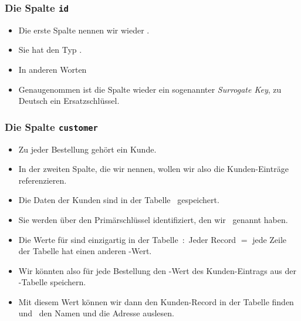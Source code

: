 \documentclass[aspectratio=169,mathserif,notheorems]{beamer}%
\begin{document}
%
\begin{frame}%
\frametitle{Die Spalte \texttt{id}}%
\begin{itemize}%
\item Die erste Spalte nennen wir wieder .%
\item<2-> Sie hat den Typ .%
\item<3-> In anderen Worten%
\item<7-> Genaugenommen ist die Spalte wieder ein sogenannter \emph{Surrogate Key}, zu Deutsch ein Ersatzschlüssel.%
\end{itemize}%
\end{frame}%
%
\begin{frame}%
\frametitle{Die Spalte \texttt{customer}}%
\begin{itemize}%
\item Zu jeder Bestellung gehört ein Kunde.%
\item<2-> In der zweiten Spalte, die wir  nennen, wollen wir also die Kunden-Einträge referenzieren.%
\item<3-> Die Daten der Kunden sind in der Tabelle~ gespeichert.%
\item<4-> Sie werden über den Primärschlüssel identifiziert, den wir~ genannt haben.%
\item<5-> Die Werte für  sind einzigartig in der Tabelle~:~Jeder Record $=$ jede Zeile der Tabelle hat einen anderen -Wert.%
\item<6-> Wir könnten also für jede Bestellung den -Wert des Kunden-Eintrags aus der -Tabelle speichern.%
\item<7-> Mit diesem Wert können wir dann den Kunden-Record in der Tabelle  finden und \DEzB~den Namen und die Adresse auslesen.%
\end{itemize}%
\end{frame}%
%
\end{document}
